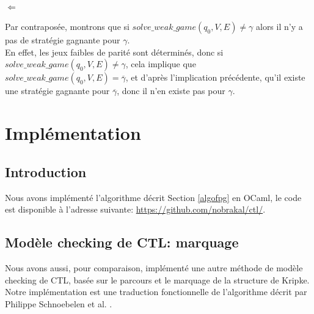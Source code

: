 \documentclass[10pt,a4paper]{article}
\begin{document}
\paragraph{$\Longleftarrow$}
Par contraposée, montrons que si $solve\_weak\_game(q_0,V,E) \neq \gamma$ alors il n'y a pas de stratégie gagnante pour $\gamma$.\\
En effet, les jeux faibles de parité sont déterminés, donc si $solve\_weak\_game(q_0,V,E) \neq \gamma$, cela implique que $solve\_weak\_game(q_0,V,E) = \overline{\gamma}$, et d'après l'implication précédente, qu'il existe une stratégie gagnante pour $\overline{\gamma}$, donc il n'en existe pas pour $\gamma$.

\section{Implémentation}
\subsection{Introduction}
Nous avons implémenté l'algorithme décrit Section \ref{algofpg} en OCaml, le code est disponible à l'adresse suivante: \url{https://github.com/nobrakal/ctl/}.

\subsection{Modèle checking de CTL: marquage}
Nous avons aussi, pour comparaison, implémenté une autre méthode de modèle checking de CTL, basée sur le parcours et le marquage de la structure de Kripke. Notre implémentation est une traduction fonctionnelle de l'algorithme décrit par Philippe Schnoebelen et al. \cite{verif}.



\end{document}
